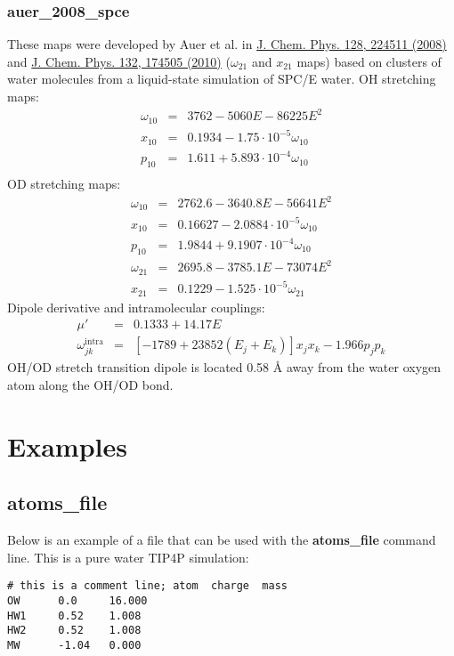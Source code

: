 \documentclass{article}
\begin{document}
\subsubsection{auer\_2008\_spce}
These maps were developed by  Auer et al. in \href{https://doi.org/10.1063/1.2925258}{J. Chem. Phys. 128, 224511 (2008)} 
and \href{http://dx.doi.org/10.1063/1.3409561}{J. Chem. Phys. 132, 174505 (2010)} ($\omega_{21}$ and $x_{21}$ maps)
based on clusters
of water molecules from a liquid-state simulation of SPC/E water. OH stretching maps:
\begin{eqnarray}
\omega_{10} &=& 3762 - 5060E-86225 E^2\nonumber\\
x_{10} &=& 0.1934 - 1.75\cdot 10^{-5} \omega_{10} \nonumber \\
p_{10} &=& 1.611 + 5.893\cdot 10^{-4} \omega_{10} \nonumber \\
\end{eqnarray}
OD stretching maps:
\begin{eqnarray}
\omega_{10} &=& 2762.6 - 3640.8E-56641 E^2 \nonumber\\
x_{10} &=& 0.16627 - 2.0884\cdot 10^{-5} \omega_{10} \nonumber \\
p_{10} &=& 1.9844 + 9.1907\cdot 10^{-4} \omega_{10} \nonumber \\
\omega_{21} &=& 2695.8 - 3785.1E-73074 E^2 \nonumber \\
x_{21} &=& 0.1229 - 1.525\cdot 10^{-5} \omega_{21} \nonumber 
\end{eqnarray}
Dipole derivative and intramolecular couplings:
\begin{eqnarray}
\mu' &=& 0.1333 + 14.17E \nonumber \\
\omega_{jk}^\text{intra}&=& [-1789 + 23852(E_j + E_k)]x_jx_k - 1.966 p_j p_k \nonumber
\end{eqnarray}
OH/OD stretch transition dipole is located 0.58 \AA{} away from the water oxygen atom along the OH/OD bond.


\section{Examples}


 



\begin{appendix}
\section{\label{app:atomsf}atoms\_file}
Below is an example of a file that can be used with the \textbf{atoms\_file} command line. This is a pure water TIP4P simulation:
\begin{verbatim}
# this is a comment line; atom  charge  mass
OW      0.0     16.000
HW1     0.52    1.008
HW2     0.52    1.008
MW      -1.04   0.000
\end{verbatim}

\end{appendix}
\end{document}
